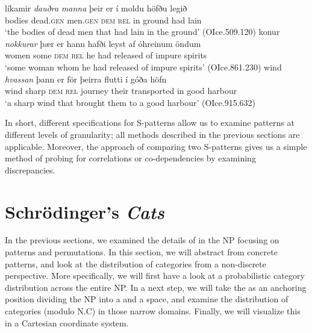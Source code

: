 \documentclass[output=paper,colorlinks,citecolor=brown,draft]{langscibook}
\begin{document}
\ea \label{exDemGen}
    \ea \gll líkamir \textit{dauðra} \textit{manna} þeir er í moldu höfðu legið \\  
             bodies dead.\textsc{gen} men.\textsc{gen} \textsc{dem}  \textsc{rel} in ground had lain \\
        \glt `the bodies of dead men that had lain in the ground'  
        (OIce.509.120) 
    \ex \gll konur \textit{nokkurar} þær er hann hafði leyst af óhreinum öndum \\ 
          women some \textsc{dem} \textsc{rel} he had released of impure spirits \\ 
          `some woman whom he had released of impure spirits' 
        (OIce.861.230) 
        \glt 
    \ex \gll wind \textit{hvassan}  þann er för þeirra flutti í góða höfn \\ 
        wind sharp \textsc{dem} \textsc{rel} journey their transported in good harbour \\ 
        `a sharp wind that brought them to a good harbour'  
        (OIce.915.632)  
        \glt 
    \z
\z

In short, different specifications for S-patterns allow us to examine patterns at different levels of granularity; all methods described in the previous sections are applicable. Moreover, the approach of comparing two S-patterns gives us a simple method of probing for correlations or co-dependencies by examining discrepancies. 

\section{Schrödinger's \textit{Cats} }  %
\label{sec:schrodinger}

In the previous sections, we examined the details of   in the NP  focusing on patterns and permutations. 
In this section, we will abstract from concrete patterns, and look at the distribution of categories from a  non-discrete perspective. More specifically, we will first have a look at a probabilistic category distribution across the entire NP. In a next step, we will take the  as an anchoring position dividing the NP into a  and a  space, and examine the distribution of categories (modulo N.C) in those narrow domains. Finally, we will visualize this  in a Cartesian coordinate system. 
\end{document}

